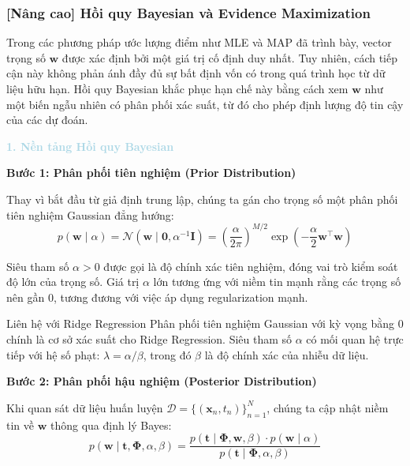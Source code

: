 \subsubsection{[Nâng cao] Hồi quy Bayesian và Evidence Maximization}

Trong các phương pháp ước lượng điểm như MLE và MAP đã trình bày, vector trọng số $\mathbf{w}$ được xác định bởi một giá trị cố định duy nhất. Tuy nhiên, cách tiếp cận này không phản ánh đầy đủ sự bất định vốn có trong quá trình học từ dữ liệu hữu hạn. Hồi quy Bayesian khắc phục hạn chế này bằng cách xem $\mathbf{w}$ như một biến ngẫu nhiên có phân phối xác suất, từ đó cho phép định lượng độ tin cậy của các dự đoán.

\vspace{0.5em}
\textcolor{lightblue}{\textbf{1. Nền tảng Hồi quy Bayesian}}
\vspace{0.5em}

\textbf{Bước 1: Phân phối tiên nghiệm (Prior Distribution)}

Thay vì bắt đầu từ giả định trung lập, chúng ta gán cho trọng số một phân phối tiên nghiệm Gaussian đẳng hướng:
\begin{equation}
p(\mathbf{w} \mid \alpha) = \mathcal{N}(\mathbf{w} \mid \mathbf{0}, \alpha^{-1}\mathbf{I}) = \left(\frac{\alpha}{2\pi}\right)^{M/2} \exp\left(-\frac{\alpha}{2}\mathbf{w}^{\top}\mathbf{w}\right)
\label{eq:bayesian_prior}
\end{equation}

Siêu tham số $\alpha > 0$ được gọi là độ chính xác tiên nghiệm, đóng vai trò kiểm soát độ lớn của trọng số. Giá trị $\alpha$ lớn tương ứng với niềm tin mạnh rằng các trọng số nên gần 0, tương đương với việc áp dụng regularization mạnh.

\begin{notebox}{Liên hệ với Ridge Regression}
Phân phối tiên nghiệm Gaussian với kỳ vọng bằng 0 chính là cơ sở xác suất cho Ridge Regression. Siêu tham số $\alpha$ có mối quan hệ trực tiếp với hệ số phạt: $\lambda = \alpha / \beta$, trong đó $\beta$ là độ chính xác của nhiễu dữ liệu.
\end{notebox}

\textbf{Bước 2: Phân phối hậu nghiệm (Posterior Distribution)}

Khi quan sát dữ liệu huấn luyện $\mathcal{D} = \{(\mathbf{x}_n, t_n)\}_{n=1}^{N}$, chúng ta cập nhật niềm tin về $\mathbf{w}$ thông qua định lý Bayes:
\begin{equation}
p(\mathbf{w} \mid \mathbf{t}, \mathbf{\Phi}, \alpha, \beta) = \frac{p(\mathbf{t} \mid \mathbf{\Phi}, \mathbf{w}, \beta) \cdot p(\mathbf{w} \mid \alpha)}{p(\mathbf{t} \mid \mathbf{\Phi}, \alpha, \beta)}
\end{equation}

